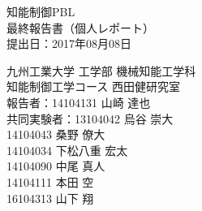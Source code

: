 \def\maintitle{知能制御PBL\\}
\def\subtitle{最終報告書（個人レポート）\\}
\def\affiliation{九州工業大学 工学部 機械知能工学科\\知能制御工学コース 西田健研究室\\}

\def\dates{
  \hspace{0mm} 提出日：2017年08月08日 \\
}

\def\members{
      報告者：{\large 14104131} \hspace{1mm} 山崎 達也　　 \\
  共同実験者：{\large 13104042} \hspace{1mm} 烏谷 崇大　　 \\
              {\large 14104043} \hspace{1mm} 桑野 僚大　　 \\
              {\large 14104034} \hspace{1mm} 下松八重 宏太 \\
              {\large 14104090} \hspace{1mm} 中尾 真人　　 \\
              {\large 14104111} \hspace{1mm} 本田 空　　　 \\
              {\large 16104313} \hspace{1mm} 山下 翔　　　 \\
}

\begin{titlepage}
  \vspace*{25mm}
  \begin{center}
    {\huge \maintitle} \vspace{5mm}
    {\Huge \subtitle}  \vspace{20mm}
    {\Large \dates}
  \end{center}
  \vspace{25mm}
  \begin{flushright}
    {\LARGE \affiliation}
    \vspace{10mm}
    {\Large \members}
  \end{flushright}
\end{titlepage}

